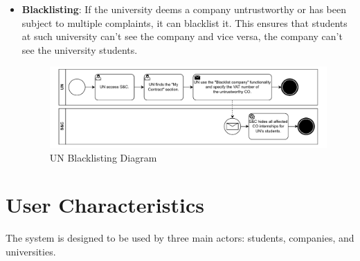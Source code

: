 \begin{itemize}
      \item \textbf{Blacklisting}: If the university deems a company untrustworthy or has been subject to multiple
            complaints, it can blacklist it. This ensures that students at such university can’t see the company and
            vice versa, the company can’t see the university students.

            \begin{figure}[H]
                  \centering
                  \includegraphics[width=1.0\textwidth]{Images/BPMN_16.pdf}
                  \caption{UN Blacklisting Diagram}
                  \label{fig:un_blacklisting_diagram}
            \end{figure}

\end{itemize}

\section{User Characteristics}
\label{sec:user_characteristics}%

\par The system is designed to be used by three main actors: students, companies, and universities.

